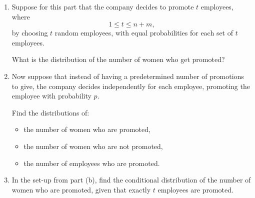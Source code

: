 \documentclass[11pt]{article}
\begin{document}
\begin{enumerate}[label=(\alph*), leftmargin=*]
    \item Suppose for this part that the company decides to promote $t$ employees, where
    \[
    1\le t\le n+m,
    \]
    by choosing $t$ random employees, with equal probabilities for each set of $t$ employees.

    What is the distribution of the number of women who get promoted?

    \item Now suppose that instead of having a predetermined number of promotions to give, the company decides independently for each employee, promoting the employee with probability $p$.

    Find the distributions of:
    \begin{itemize}
        \item the number of women who are promoted,
        \item the number of women who are not promoted,
        \item the number of employees who are promoted.
    \end{itemize}

    \item In the set-up from part (b), find the conditional distribution of the number of women who are promoted, given that exactly $t$ employees are promoted.
\end{enumerate}
\end{document}
